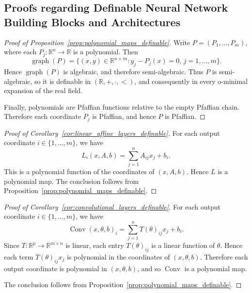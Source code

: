 \documentclass{article}
\theoremstyle{plain}
\theoremstyle{definition}
\theoremstyle{remark}
\theoremstyle{plain}
\numberwithin{thm}{section}
\theoremstyle{definition}
\numberwithin{equation}{section}
\begin{document}
\subsection{Proofs regarding Definable Neural Network Building Blocks and Architectures}
\label{s:Proofs_Examples}


\begin{proof}[{Proof of Proposition~\ref{prop:polynomial_maps_definable}}]
Write
$
    P=(P_1,\dots,P_m)
$,
where each $P_j:\mathbb{R}^n\to\mathbb{R}$ is a polynomial.  Then
$$
    \operatorname{graph}(P)
    =
    \Big\{
        (x,y)\in\mathbb{R}^{n+m}:
        y_j-P_j(x)=0,\,
        j=1,\dots,m
    \Big\}.
$$
Hence $\operatorname{graph}(P)$ is algebraic, and therefore semi-algebraic.  Thus $P$ is semi-algebraic, so it is definable in $(\mathbb{R},+,\cdot,<)$, and consequently in every o-minimal expansion of the real field.

Finally, polynomials are Pfaffian functions relative to the empty Pfaffian chain.  Therefore each coordinate $P_j$ is Pfaffian, and hence $P$ is Pfaffian.
\end{proof}

\begin{proof}[Proof of Corollary~\ref{cor:linear_affine_layers_definable}]
For each output coordinate $i\in\{1,\dots,m\}$, we have
\[
    L_i(x,A,b)
    =
    \sum_{j=1}^n A_{ij}x_j+b_i .
\]
This is a polynomial function of the coordinates of $(x,A,b)$. Hence $L$ is a polynomial map. The conclusion follows from Proposition~\ref{prop:polynomial_maps_definable}.
\end{proof}

\begin{proof}[Proof of Corollary~\ref{cor:convolutional_layers_definable}]
For each output coordinate $i\in\{1,\dots,m\}$, we have
\[
    \operatorname{Conv}(x,\theta,b)_i
    =
    \sum_{j=1}^n T(\theta)_{ij}x_j+b_i .
\]
Since $T:\mathbb{R}^p\to\mathbb{R}^{m\times n}$ is linear, each entry $T(\theta)_{ij}$ is a linear function of $\theta$. Hence each term $T(\theta)_{ij}x_j$ is polynomial in the coordinates of $(x,\theta,b)$. Therefore each output coordinate is polynomial in $(x,\theta,b)$, and so $\operatorname{Conv}$ is a polynomial map.

The conclusion follows from Proposition~\ref{prop:polynomial_maps_definable}.
\end{proof}
\end{document}
